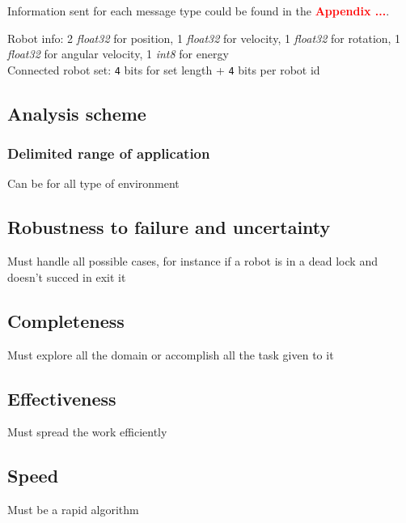 \documentclass[main.tex]{subfiles}
\begin{document}
Information sent for each message type could be found in the \textcolor{red}{\textbf{Appendix ...}}.

Robot info:
2 \textit{float32} for position, 1 \textit{float32} for velocity, 1 \textit{float32} for rotation, 1 \textit{float32} for angular velocity, 1 \textit{int8} for energy\\

Connected robot set:
\texttt{4} bits for set length + \texttt{4} bits per robot id



\subsection{Analysis scheme}

\subsubsection{Delimited range of application}
Can be for all type of environment

\subsection{Robustness to failure and uncertainty}
Must handle all possible cases, for instance if a robot is in a dead lock and doesn't succed in exit it

\subsection{Completeness}
Must explore all the domain or accomplish all the task given to it

\subsection{Effectiveness}
Must spread the work efficiently

\subsection{Speed}
Must be a rapid algorithm
\end{document}
